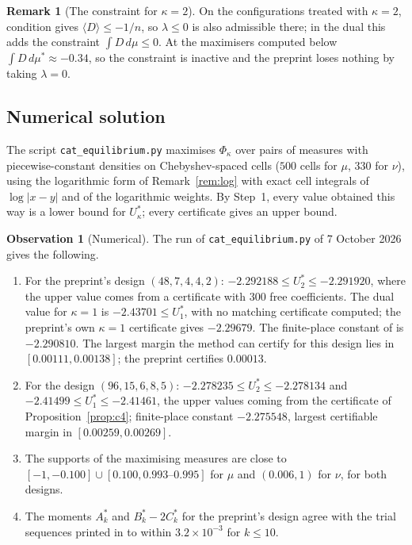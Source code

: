 \documentclass[11pt]{article}
\theoremstyle{definition}
\newtheorem{remark}[theorem]{Remark}
\newtheorem{observation}[theorem]{Observation}
\begin{document}
\begin{remark}[The constraint for $\kappa=2$]
On the configurations treated with $\kappa=2$, condition \cite[Eq.~(67)]{OAI} gives $\langle D\rangle\le-1/n$, so $\lambda\le0$ is also admissible there; in the dual this adds the constraint $\int D\,d\mu\le0$. At the maximisers computed below $\int D\,d\mu^*\approx-0.34$, so the constraint is inactive and the preprint loses nothing by taking $\lambda=0$.
\end{remark}

\subsection{Numerical solution}

The script \texttt{cat\_equilibrium.py} maximises $\Phi_\kappa$ over pairs of measures with piecewise-constant densities on Chebyshev-spaced cells ($500$ cells for $\mu$, $330$ for $\nu$), using the logarithmic form of Remark~\ref{rem:log} with exact cell integrals of $\log|x-y|$ and of the logarithmic weights. By Step~1, every value obtained this way is a lower bound for $U^*_\kappa$; every certificate gives an upper bound.

\begin{observation}[Numerical]
The run of \texttt{cat\_equilibrium.py} of 7 October 2026 gives the following.
\begin{enumerate}
\item For the preprint's design $(48,7,4,4,2)$: $-2.292188\le U^*_2\le-2.291920$, where the upper value comes from a certificate with $300$ free coefficients. The dual value for $\kappa=1$ is $-2.43701\le U^*_1$, with no matching certificate computed; the preprint's own $\kappa=1$ certificate gives $-2.29679$. The finite-place constant of \cite[Prop.~3.4]{OAI} is $-2.290810$. The largest margin the method can certify for this design lies in $[0.00111,0.00138]$; the preprint certifies $0.00013$.
\item For the design $(96,15,6,8,5)$: $-2.278235\le U^*_2\le-2.278134$ and $-2.41499\le U^*_1\le-2.41461$, the upper values coming from the certificate of Proposition~\ref{prop:c4}; finite-place constant $-2.275548$, largest certifiable margin in $[0.00259,0.00269]$.
\item The supports of the maximising measures are close to $[-1,-0.100]\cup[0.100,0.993\text{--}0.995]$ for $\mu$ and $(0.006,1)$ for $\nu$, for both designs.
\item The moments $A^*_k$ and $B^*_k-2C^*_k$ for the preprint's design agree with the trial sequences printed in \cite[Sec.~7]{OAI} to within $3.2\times10^{-3}$ for $k\le10$.
\end{enumerate}
\end{observation}
\end{document}

